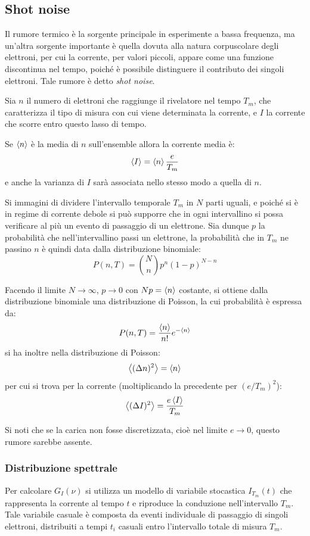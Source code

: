 \subsection{Shot noise}

Il rumore termico è la sorgente principale in esperimente a bassa frequenza, ma un'altra sorgente importante è quella dovuta alla natura corpuscolare degli elettroni, per cui la corrente, per valori piccoli, appare come una funzione discontinua nel tempo, poiché è possibile distinguere il contributo dei singoli elettroni. Tale rumore è detto \textit{shot noise}.

Sia $ n $ il numero di elettroni che raggiunge il rivelatore nel tempo $ T_m $, che caratterizza il tipo di misura con cui viene determinata la corrente, e $ I $ la corrente che scorre entro questo lasso di tempo.

Se $ \expval{n} $ è la media di $ n $ sull'ensemble allora la corrente media è:
\[ \expval{I} = \expval{n} \frac{e}{T_m} \]
e anche la varianza di $ I $ sarà associata nello stesso modo a quella di $ n $.

Si immagini di dividere l'intervallo temporale $ T_m $ in $ N $ parti uguali, e poiché si è in regime di corrente debole si può supporre che in ogni intervallino si possa verificare al più un evento di passaggio di un elettrone.
Sia dunque $ p $ la probabilità che nell'intervallino passi un elettrone, la probabilità che in $ T_m $ ne passino $ n $ è quindi data dalla distribuzione binomiale:
\[ P(n, T) = \binom{N}{n} p^n (1-p)^{N-n} \]

Facendo il limite $ N \rightarrow \infty $, $ p \rightarrow 0 $ con $ Np = \expval{n} $ costante, si ottiene dalla distribuzione binomiale una distribuzione di Poisson, la cui probabilità è espressa da:
\[ P(n,T) = \frac{\expval{n}}{n!} e^{-\expval{n}} \]
si ha inoltre nella distribuzione di Poisson:
\[ \expval{(\Delta n)^2} = \expval{n} \]
per cui si trova per la corrente (moltiplicando la precedente per $ (e/T_m)^2 $):
\[ \expval{(\Delta I)^2} = \frac{e\expval{I}}{T_m} \]

Si noti che se la carica non fosse discretizzata, cioè nel limite $ e \rightarrow 0 $, questo rumore sarebbe assente.

\subsubsection{Distribuzione spettrale}

Per calcolare $ G_I(\nu) $ si utilizza un modello di variabile stocastica $ I_{T_m}(t) $ che rappresenta la corrente al tempo $ t $ e riproduce la conduzione nell'intervallo $ T_m $. Tale variabile casuale è composta da eventi individuale di passaggio di singoli elettroni, distribuiti a tempi $ t_i $ casuali entro l'intervallo totale di misura $ T_m $.

